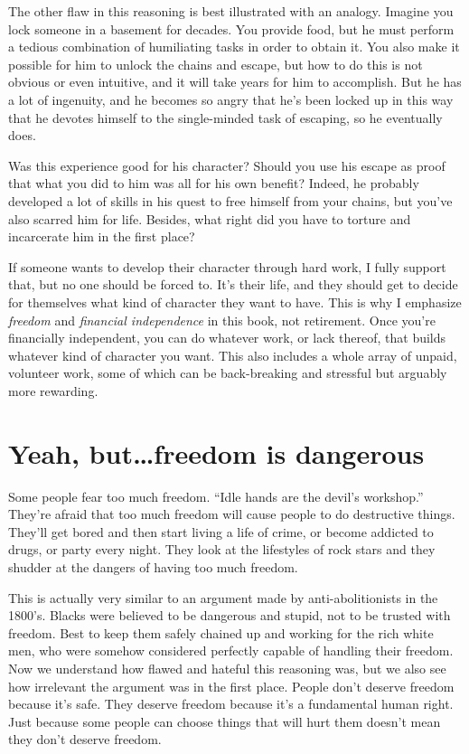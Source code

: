 The other flaw in this reasoning is best illustrated with an analogy. Imagine you lock someone in a basement for decades. You provide food, but he must perform a tedious combination of humiliating tasks in order to obtain it. You also make it possible for him to unlock the chains and escape, but how to do this is not obvious or even intuitive, and it will take years for him to accomplish. But he has a lot of ingenuity, and he becomes so angry that he's been locked up in this way that he devotes himself to the single-minded task of escaping, so he eventually does.

Was this experience good for his character? Should you use his escape as proof that what you did to him was all for his own benefit? Indeed, he probably developed a lot of skills in his quest to free himself from your chains, but you've also scarred him for life. Besides, what right did you have to torture and incarcerate him in the first place?

If someone wants to develop their character through hard work, I fully support that, but no one should be forced to. It's their life, and they should get to decide for themselves what kind of character they want to have. This is why I emphasize \emph{freedom} and \emph{financial independence} in this book, not retirement. Once you're financially independent, you can do whatever work, or lack thereof, that builds whatever kind of character you want. This also includes a whole array of unpaid, volunteer work, some of which can be back-breaking and stressful but arguably more rewarding.

\section{Yeah, but\ldots freedom is dangerous}
Some people fear too much freedom. ``Idle hands are the devil's workshop.'' They're afraid that too much freedom will cause people to do destructive things. They'll get bored and then start living a life of crime, or become addicted to drugs, or party every night. They look at the lifestyles of rock stars and they shudder at the dangers of having too much freedom.

This is actually very similar to an argument made by anti-abolitionists in the 1800's. Blacks were believed to be dangerous and stupid, not to be trusted with freedom. Best to keep them safely chained up and working for the rich white men, who were somehow considered perfectly capable of handling their freedom. Now we understand how flawed and hateful this reasoning was, but we also see how irrelevant the argument was in the first place. People don't deserve freedom because it's safe. They deserve freedom because it's a fundamental human right. Just because some people can choose things that will hurt them doesn't mean they don't deserve freedom.

